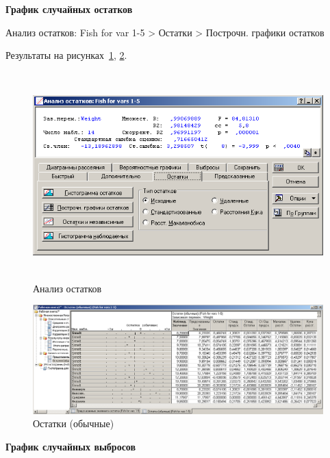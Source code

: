 \newpage

\begin{center}
  \textbf{График случайных остатков}
\end{center}

Анализ остатков: Fish for var 1-5 > Остатки > Построчн. графики остатков

Результаты на рисунках~\ref{fig:var5__27}, \ref{fig:var5__28}.

\begin{figure}[!h]
  \centering

  \includegraphics[height=8cm]
  {inc/var5__27.PNG}

  \caption{Анализ остатков}

  \label{fig:var5__27}
\end{figure}

\begin{figure}[!h]
  \centering

  \includegraphics[width=17cm]
  {inc/var5__28.PNG}

  \caption{Остатки (обычные)}

  \label{fig:var5__28}
\end{figure}

\newpage

\textbf{График случайных выбросов}

